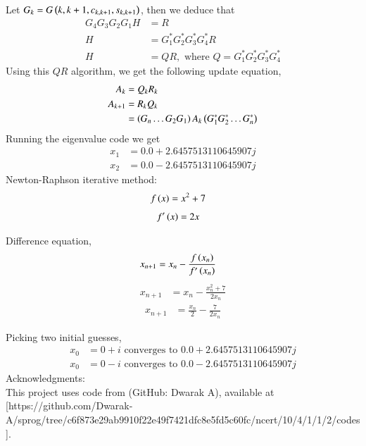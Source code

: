 \documentclass[journal]{IEEEtran}
\numberwithin{equation}{enumi}
\numberwithin{figure}{enumi}
\begin{document}
Let $G_k = G\left(k, k + 1, c_{k, k+1}, s_{k, k+1}\right)$, then we deduce that
\begin{align}
	G_4 G_3 G_2 G_1 H &= R\\
	H &= G_1^{\ast} G_2^{\ast} G_3^{\ast} G_4^{\ast} R\\
	H &= QR, \text{ where } Q = G_1^{\ast} G_2^{\ast} G_3^{\ast} G_4^{\ast}
\end{align}
Using this $QR$ algorithm, we get the following update equation,
\begin{align}
	A_{k} &= Q_{k}R_{k}\\
	A_{k + 1} &= R_{k}Q_{k}\\
	&= \left(G_{n}\dots G_{2} G_{1}\right) A_{k} \left(G_1^{\ast} G_2^{\ast} \dots G_n^{\ast}\right)
\end{align}
Running the eigenvalue code we get
\begin{align}
	x_1 &= 0.0 + 2.6457513110645907j
\end{align}
\begin{align}
	x_2 &= 0.0 - 2.6457513110645907j
\end{align}
Newton-Raphson iterative method:
\begin{align}
    f\left(x\right) &= x^2 + 7
\end{align}
\begin{align}
    f^\prime\left(x\right) &= 2x
\end{align}

Difference equation,
\begin{align}
    x_{n+1} &= x_n - \frac{f\left(x_{n}\right)}{f^\prime\left(x_n\right)}
\end{align}
\begin{align}
    x_{n+1} &= x_n - \frac{x_n^2 + 7}{2x_n}
\end{align}
\begin{align}
    x_{n+1} &= \frac{x_n}{2} - \frac{7}{2x_n}
\end{align}

Picking two initial guesses,
\begin{align}
    x_0 &= 0 + i \text{ converges to } 0.0 + 2.6457513110645907j
\end{align}
\begin{align}
    x_0 &= 0 - i \text{ converges to } 0.0 - 2.6457513110645907j
\end{align}
Acknowledgments:\\  
This project uses code from (GitHub: Dwarak A), available at [https://github.com/Dwarak-A/sprog/tree/c6f873e29ab9910f22e49f7421dfc8e5fd5c60fc/ncert/10/4/1/1/2/codes].
\end{document}
